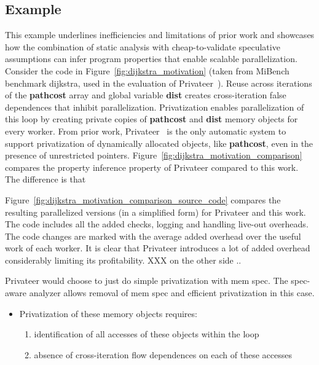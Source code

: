 \subsection{Example}
\label{motiv_example}

This example underlines inefficiencies and limitations of prior work and
showcases how the combination of static analysis with cheap-to-validate
speculative assumptions can infer program properties that enable scalable
parallelization.
%
Consider the code in
Figure~\ref{fig:dijkstra_motivation} (taken from MiBench~\cite{} benchmark
dijkstra, used in the evaluation of Privateer~\cite{}).
%
Reuse across iterations of the \textbf{pathcost} array and global variable
\textbf{dist} creates cross-iteration false dependences that inhibit
parallelization.
%
Privatization enables parallelization of this loop by creating private
copies of \textbf{pathcost} and \textbf{dist} memory objects for every
worker.
%
From prior work, Privateer~\cite{johnson:12:pldi} is the only automatic
system to support privatization of dynamically allocated objects, like
\textbf{pathcost}, even in the presence of unrestricted pointers.
%
Figure~\ref{fig:dijkstra_motivation_comparison} compares the property
inference property of Privateer compared to this work.
The difference is that

Figure~\ref{fig:dijkstra_motivation_comparison_source_code} compares the
resulting parallelized versions (in a simplified form) for Privateer and
this work. The code includes all the added checks, logging and handling
live-out overheads. The code changes are marked with the average added
overhead over the useful work of each worker.
It is clear that Privateer introduces a lot of added overhead considerably
limiting its profitability. XXX on the other side ..


Privateer would choose to just do simple privatization with mem spec.
The spec-aware analyzer allows removal of mem spec and efficient
privatization in this case.

\begin{itemize}
\item
Privatization of these memory objects requires:
\begin{enumerate}
\item
identification of all accesses of these objects
    within the loop
\item
absence of cross-iteration flow
     dependences on each of these accesses
\end{enumerate}

\end{itemize}


